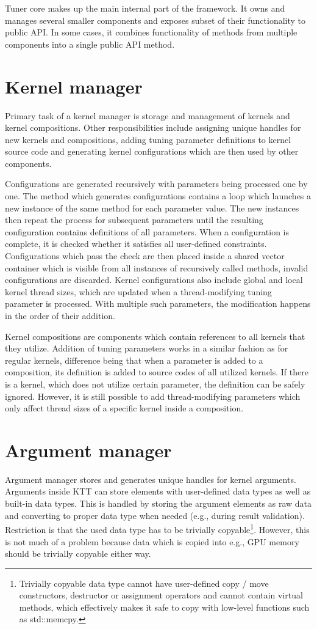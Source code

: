 \documentclass
[
    digital, %
    oneside, %
    table, %
    nolof, %
    nolot, %
    nocover %
]{fithesis3}
\begin{document}
Tuner core makes up the main internal part of the framework. It owns and manages several smaller components and exposes subset of their functionality
to public API. In some cases, it combines functionality of methods from multiple components into a single public API method.

\section{Kernel manager}
Primary task of a kernel manager is storage and management of kernels and kernel compositions. Other responsibilities include assigning unique handles for
new kernels and compositions, adding tuning parameter definitions to kernel source code and generating kernel configurations which are then used by other
components.

Configurations are generated recursively with parameters being processed one by one. The method which generates configurations contains a loop which
launches a new instance of the same method for each parameter value. The new instances then repeat the process for subsequent parameters until the
resulting configuration contains definitions of all parameters. When a configuration is complete, it is checked whether it satisfies all user-defined
constraints. Configurations which pass the check are then placed inside a shared vector container which is visible from all instances of recursively
called methods, invalid configurations are discarded. Kernel configurations also include global and local kernel thread sizes, which are updated when
a thread-modifying tuning parameter is processed. With multiple such parameters, the modification happens in the order of their addition.

Kernel compositions are components which contain references to all kernels that they utilize. Addition of tuning parameters works in a similar fashion
as for regular kernels, difference being that when a parameter is added to a composition, its definition is added to source codes of all utilized kernels.
If there is a kernel, which does not utilize certain parameter, the definition can be safely ignored. However, it is still possible to add thread-modifying
parameters which only affect thread sizes of a specific kernel inside a composition.

\section{Argument manager}
Argument manager stores and generates unique handles for kernel arguments. Arguments inside KTT can store elements with user-defined data types as well as
built-in data types. This is handled by storing the argument elements as raw data and converting to proper data type when needed (e.g., during result
validation). Restriction is that the used data type has to be trivially copyable\footnote{Trivially copyable data type cannot have user-defined
copy / move constructors, destructor or assignment operators and cannot contain virtual methods, which effectively makes it safe to copy with low-level
functions such as std::memcpy.}. However, this is not much of a problem because data which is copied into e.g., GPU memory should be trivially copyable
either way.
\end{document}
